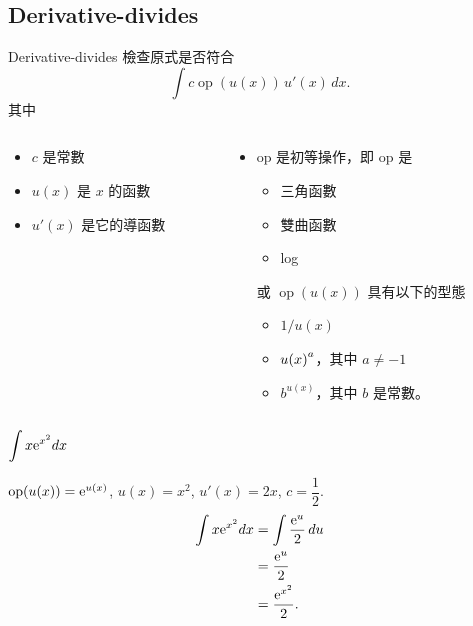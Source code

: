 \documentclass{beamer}
\newcommand{\Left} {\mathopen{}\mathclose\bgroup\left}
\newcommand{\Right}{\aftergroup\egroup\right}
\newcommand{\e}{\textup e}
\newcommand{\op}  {\operatorname{op}}
\theoremstyle{remark}
\begin{document}
\subsection[Deriv.\ divides]{Derivative-divides}
\begin{frame}{Derivative-divides}
  檢查原式是否符合
  \begin{equation}
    \int c \op(u(x))\,u'(x)\,dx. \label{eq:DerivativeDivides}
  \end{equation}
  其中
  \begin{columns}
    \begin{column}[t]{0.4\textwidth}
      \begin{itemize}
	\item $c$ 是常數
	\item $u(x)$ 是 $x$ 的函數
	\item $u'(x)$ 是它的導函數
      \end{itemize}
    \end{column}
    \begin{column}[t]{0.6\textwidth}
      \begin{itemize}
	\item op 是初等操作，即 op 是
	  \begin{itemize}
	    \item 三角函數
	    \item 雙曲函數
	    \item log
	  \end{itemize}
	  或 $\op(u(x))$ 具有以下的型態
	  \begin{itemize}
	    \item $1/u(x)$
	    \item $u \Left( x \Right)^a$，其中 $a \ne -1$
	    \item $b^{u(x)}$，其中 $b$ 是常數。
	  \end{itemize}
      \end{itemize}
    \end{column}
  \end{columns}
\end{frame}

\begin{frame}{$\displaystyle \int x\e^{x^2} dx$}
  \begin{solution}
    $\op(u(x)) = \e^{u(x)}$, $u(x) = x^2$, $u'(x) = 2x$, $c = \dfrac12$.
    \begin{align*}
      \int x\e^{x^2} dx &= \int \frac{\e^u}{2}\,du\\
	&= \frac{\e^u}{2}\\
	&= \frac{\e^{x^2}}{2}.
    \end{align*}
  \end{solution}
\end{frame}
\end{document}
